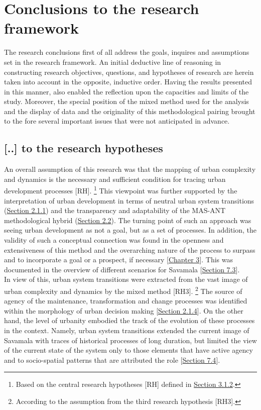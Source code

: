 \documentclass[11pt]{report}
\begin{document}
{{{\section{Conclusions to the research framework}

The research conclusions first of all address the goals, inquires and assumptions set in the research framework.
An initial deductive line of reasoning in constructing research objectives, questions, and hypotheses of research are herein taken into account in the opposite, inductive order.
Having the results presented in this manner, also enabled the reflection upon the capacities and limits of the study.
Moreover, the special position of the mixed method used for the analysis and the display of data and the originality of this methodological pairing brought to the fore several important issues that were not anticipated in advance.

\subsection{[..] to the research hypotheses}

An overall assumption of this research was that the mapping of urban complexity and dynamics is the necessary and sufficient condition for tracing urban development processes [RH].
\footnote{Based on the central research hypotheses [RH] defined in \href{Section 3.1.2}{Section 3.1.2}.}
This viewpoint was further supported by the interpretation of urban development in terms of neutral urban system transitions (\href{Section 2.1.1}{Section 2.1.1}) and the transparency and adaptability of the MAS-ANT methodological hybrid (\href{Section 2.2}{Section 2.2}).
The turning point of such an approach was seeing urban development as not a goal, but as a set of processes. In addition, the validity of such a conceptual connection was found in the openness and extensiveness of this method and the overarching nature of the process to surpass and to incorporate a goal or a prospect, if necessary [\href{Chapter 3}{Chapter 3}].
This was documented in the overview of different scenarios for Savamala [\href{Section 7.3}{Section 7.3}].
\\

In view of this, urban system transitions were extracted from the vast image of urban complexity and dynamics by the mixed method [RH3].
\footnote{According to the assumption from the third research hypothesis [RH3].}
The source of agency of the maintenance, transformation and change processes was identified within the morphology of urban decision making [\href{Section 2.1.4}{Section 2.1.4}]. On the other hand, the level of urbanity embodied the track of the evolution of these processes in the context.
Namely, urban system transitions extended the current image of Savamala with traces of historical processes of long duration, but limited the view of the current state of the system only to those elements that have active agency and to socio-spatial patterns that are attributed the role    [\href{Section 7.4}{Section 7.4}].
\\

}}}
\end{document}
